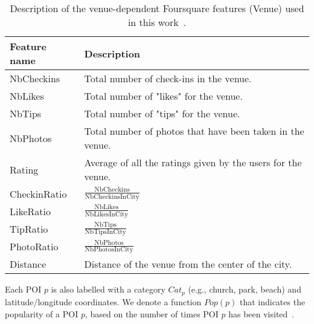 \documentclass[9pt]{extarticle}
\begin{document}
\begin{table}[ht]
\caption{Description of the venue-dependent Foursquare features (Venue) used in this work~\cite{deveaud2014importance}.}
\centering
\begin{tabular}{l|m{}} \hline
\textbf{Feature name} & \textbf{Description} \\ \hline
NbCheckins & Total number of check-ins in the venue. \\ \hline
NbLikes    & Total number of "likes" for the venue. \\ \hline
NbTips     & Total number of "tips" for the venue. \\ \hline
NbPhotos   & Total number of photos that have been taken in the venue. \\ \hline
Rating     & Average of all the ratings given by the users for the venue. \\ \hline
CheckinRatio & $\frac{\text{NbCheckins}}{\text{NbCheckinsInCity}}$ \\ \hline
LikeRatio    & $\frac{\text{NbLikes}}{\text{NbLikesInCity}}$ \\ \hline
TipRatio     & $\frac{\text{NbTips}}{\text{NbTipsInCity}}$ \\ \hline
PhotoRatio   & $\frac{\text{NbPhotos}}{\text{NbPhotosInCity}}$ \\ \hline
Distance     & Distance of the venue from the center of the city. \\ \hline
\end{tabular}
\end{table}


Each POI $p$ is also labelled with a category $Cat_p$ (e.g., church, park, beach) and latitude/longitude coordinates. 
We denote a function $Pop(p)$ that indicates the popularity of a POI $p$, based on the number of times POI $p$ has been visited~\cite{ijcai15}.



\end{document}
